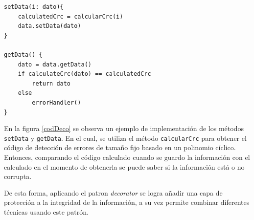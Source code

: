 \begin{lstlisting}[caption=Ejemplo de implementación métodos setData y getData del módulo CRCData.,label={codDeco},style=seudocode]
setData(i: dato){
    calculatedCrc = calcularCrc(i)
    data.setData(dato)
}

getData() {
    dato = data.getData()
    if calculateCrc(dato) == calculatedCrc
        return dato
    else
        errorHandler()
}
\end{lstlisting}

En la figura \ref{codDeco} se observa un ejemplo de implementación de los métodos \verb|setData| y \verb|getData|. En el cual, se utiliza el método \verb|calcularCrc| para obtener el código de detección de errores de tamaño fijo basado en un polinomio cíclico. Entonces, comparando el código calculado cuando se guardo la información con el calculado en el momento de obtenerla se puede saber si la información está o no corrupta. 

De esta forma, aplicando el patron \textit{decorator} se logra añadir una capa de protección a la integridad de la información, a su vez permite combinar diferentes técnicas usando este patrón.


